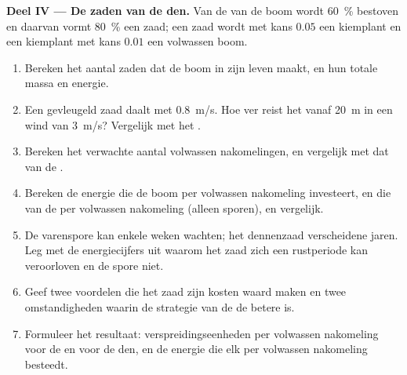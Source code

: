 \begin{problem}
\medskip
\noindent\textbf{Deel IV --- De zaden van de den.}
Van de  van de boom wordt \qty{60}{\%} bestoven en daarvan
vormt \qty{80}{\%} een zaad; een zaad wordt met kans $0.05$ een kiemplant
en een kiemplant met kans $0.01$ een volwassen boom.
\begin{enumerate}[resume]
  \item Bereken het aantal zaden dat de boom in zijn leven maakt, en hun
        totale massa en energie.
  \item Een gevleugeld zaad daalt met \qty{0.8}{m/s}. Hoe ver reist het
        vanaf \qty{20}{m} in een wind van \qty{3}{m/s}? Vergelijk met het
        .
  \item Bereken het verwachte aantal volwassen nakomelingen, en vergelijk
        met dat van de .
  \item Bereken de energie die de boom per volwassen nakomeling investeert,
        en die van de  per volwassen nakomeling (alleen sporen), en
        vergelijk.
  \item De varenspore kan enkele weken wachten; het dennenzaad
        verscheidene jaren. Leg met de energiecijfers uit waarom het zaad
        zich een rustperiode kan veroorloven en de spore niet.
  \item Geef twee voordelen die het zaad zijn kosten waard maken en twee
        omstandigheden waarin de strategie van de  de betere is.
  \item Formuleer het resultaat: verspreidingseenheden per volwassen
        nakomeling voor de  en voor de den, en de energie die elk per
        volwassen nakomeling besteedt.
\end{enumerate}
\end{problem}
